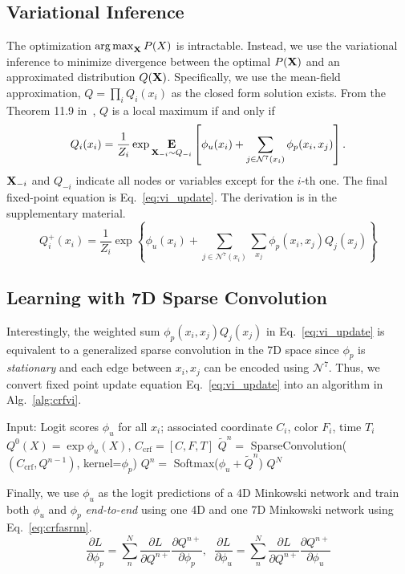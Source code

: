 \subsection{Variational Inference}
The optimization $\operatorname*{arg\,max}_{\mathbf{X}} P(X)$ is intractable. Instead, we use the variational inference to minimize divergence between the optimal $P(\mathbf{X})$ and an approximated distribution $Q(\mathbf{X})$.
Specifically, we use the mean-field approximation, $Q = \prod_i Q_i(x_i)$ as the closed form solution exists. From the Theorem 11.9 in~\cite{pgm}, $Q$ is a local maximum if and only if
\begin{equation*}
    Q_i(x_i) = \frac{1}{Z_i}\exp \underset{\mathbf{X}_{-i} \sim Q_{-i}}{\mathbf{E}} \left[\phi_u(x_i) + \sum_{j \in \mathcal{N}^7(x_
    i)} \phi_p(x_i, x_j) \right].
\end{equation*}
$\mathbf{X}_{-i}$ and $Q_{-i}$ indicate all nodes or variables except for the $i$-th one. The final fixed-point equation is Eq.~\ref{eq:vi_update}. The derivation is in the supplementary material.
\begin{equation} \label{eq:vi_update}
		Q_i^+(x_i) = \frac{1}{Z_i}\exp \left\{ \phi_u(x_i) + \sum_{j \in \mathcal{N}^7(x_i)} \sum_{x_j} \phi_p(x_i, x_j)Q_j(x_j) \right\}
\end{equation}



\subsection{Learning with 7D Sparse Convolution}
Interestingly, the weighted sum $\phi_p(x_i, x_j)Q_j(x_j)$ in Eq.~\ref{eq:vi_update} is equivalent to a generalized sparse convolution in the 7D space since $\phi_p$ is \textit{stationary} and each edge between $x_i, x_j$ can be encoded using $\mathcal{N}^7$. Thus, we convert fixed point update equation Eq.~\ref{eq:vi_update} into an algorithm in Alg.~\ref{alg:crfvi}.
\begin{algorithm}[h]
  \caption{Variational Inference of TS-CRF}
  \label{alg:crfvi}
\begin{algorithmic}
  \Require Input: Logit scores $\phi_u$ for all $x_i$; associated coordinate $C_i$, color $F_i$, time $T_i$
    \State $Q^0(X) = \exp{\phi_u(X)}$, $C_\text{crf} = [C, F, T]$
      \State $\tilde{Q}^n = $ SparseConvolution($(C_\text{crf}, Q^{n-1})$, kernel=$\phi_p$)
      \State $Q^n = $ Softmax($\phi_u + \tilde{Q}^n$)
    \EndFor
    \State \Return $Q^N$
\end{algorithmic}
\end{algorithm}

Finally, we use $\phi_u$ as the logit predictions of a 4D Minkowski network and train both $\phi_u$ and $\phi_p$ \textit{end-to-end} using one 4D and one 7D Minkowski network using Eq.~\ref{eq:crfasrnn}.
\begin{equation} \label{eq:crfasrnn}
    \frac{\partial L}{\partial \phi_p} = \sum_n^N \frac{\partial L}{\partial Q^{n+}} \frac{\partial Q^{n+}}{\partial \phi_p}, \;\;
    \frac{\partial L}{\partial \phi_u} = \sum_n^N \frac{\partial L}{\partial Q^{n+}} \frac{\partial Q^{n+}}{\partial \phi_u}
\end{equation}
